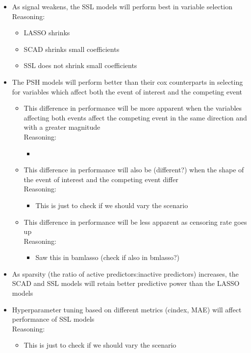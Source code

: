 \documentclass[11pt,a4paper]{article}
\let\cite\parencite
\begin{document}
\begin{itemize}
    \item As signal weakens, the SSL models will perform best in variable selection \\
    Reasoning:
    \begin{itemize}
        \item LASSO shrinks \cite{FanLi2001} 
        \item SCAD shrinks small coefficients  \cite{ZouLi2008}
        \item SSL does not shrink small coefficients \cite{Tang2017}
    \end{itemize}
    \item The PSH models will perform better than their cox counterparts in selecting for variables which affect both the event of interest and the competing event
    \begin{itemize}
        \item This difference in performance will be more apparent when the variables affecting both events affect the competing event in the same direction and with a greater magnitude\\
        Reasoning:
        \begin{itemize}
            \item \cite{Andersen2012}
        \end{itemize}
        \item This difference in performance will also be (different?) when the shape of the event of interest and the competing event differ\\
        Reasoning:
        \begin{itemize}
            \item This is just to check if we should vary the scenario
        \end{itemize}
        \item This difference in performance will be less apparent as censoring rate goes up\\
        Reasoning:
        \begin{itemize}
            \item Saw this in bamlasso \cite{GuoYi2022} (check if also in bmlasso?)
        \end{itemize}
    \end{itemize}
    \item As sparsity (the ratio of active predictors:inactive predictors) increases, the SCAD and SSL models will retain better predictive power than the LASSO models
    \item Hyperparameter tuning based on different metrics (cindex, MAE) will affect performance of SSL models\\
        Reasoning:
        \begin{itemize}
            \item This is just to check if we should vary the scenario
        \end{itemize}
\end{itemize}
\end{document}
